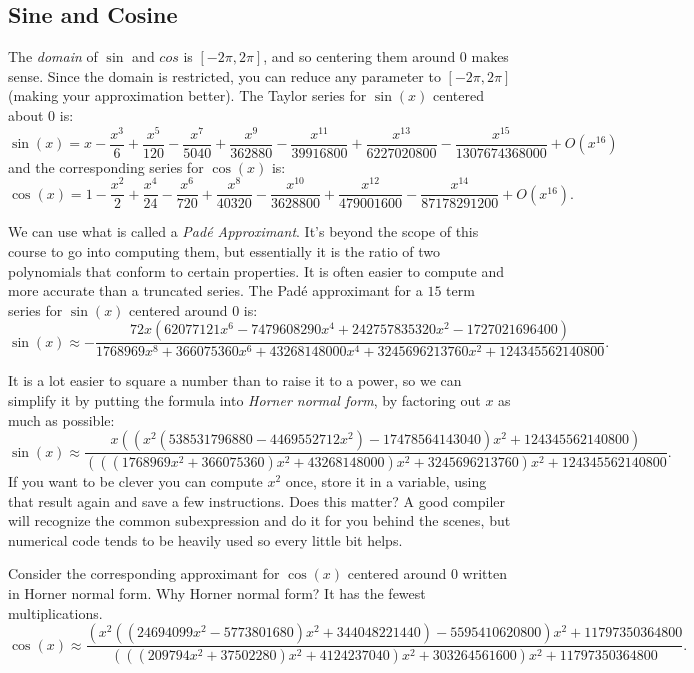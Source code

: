\documentclass[11pt]{article}
\begin{document}
\subsection{Sine and Cosine}
The \emph{domain} of $\sin$ and $cos$ is $[-2\pi, 2\pi]$, and so
centering them around $0$ makes sense. Since the domain is restricted,
you can reduce any parameter to $[-2\pi, 2\pi]$ (making your
approximation better).  The Taylor series for $\sin(x)$ centered
about $0$ is:
$$ \sin(x) =
x-\frac{x^3}{6}+\frac{x^5}{120}-\frac{x^7}{5040}+\frac{x^9}{362880}-\frac{x^{11}}{3991680
   0}+\frac{x^{13}}{6227020800}-\frac{x^{15}}{1307674368000}+O\left(x^{16}\right)
$$
and the corresponding series for $\cos(x)$ is:
$$
\cos(x) = 1-\frac{x^2}{2}+\frac{x^4}{24}-\frac{x^6}{720}+\frac{x^8}{40320}-\frac{x^{10}}{3628800}+
   \frac{x^{12}}{479001600}-\frac{x^{14}}{87178291200}+O\left(x^{16}\right) .
$$

We can use what is called a \emph{Pad\'e Approximant}. It's beyond the
scope of this course to go into computing them, but essentially it is the ratio
of two polynomials that conform to certain properties. It is often
easier to compute and more accurate than a truncated series. The
Pad\'e approximant for a $15$ term series for $\sin(x)$ centered
around $0$ is:
$$
\sin(x)  \approx
-\frac{72 x \left(62077121 x^6-7479608290 x^4+242757835320
   x^2-1727021696400\right)}{1768969 x^8+366075360 x^6+43268148000 x^4+3245696213760
   x^2+124345562140800}  .
$$

It is a lot easier to square a number than to raise it to a power,
so we can simplify it by putting the formula into \emph{Horner normal
form}, by factoring out $x$ as much as possible:
$$
\sin(x)  \approx
\frac{x \left(\left(x^2 \left(538531796880-4469552712 x^2\right)-17478564143040\right)
   x^2+124345562140800\right)}{\left(\left(\left(1768969 x^2+366075360\right)
   x^2+43268148000\right) x^2+3245696213760\right) x^2+124345562140800}
.
$$
If you want to be clever you can compute $x^2$ once, store it in a
variable, using that result again and save a few instructions. Does
this matter? A good compiler will recognize the common subexpression
and do it for you behind the scenes, but numerical code tends to
be heavily used so every little bit helps.

Consider the corresponding approximant for $\cos(x)$ centered around 0 written in
Horner normal form. Why Horner normal form? It has the fewest multiplications.
$$
\cos(x)  \approx
\frac{\left(x^2 \left(\left(24694099 x^2-5773801680\right)
   x^2+344048221440\right)-5595410620800\right)
   x^2+11797350364800}{\left(\left(\left(209794 x^2+37502280\right) x^2+4124237040\right)
   x^2+303264561600\right) x^2+11797350364800}.
$$
\end{document}
